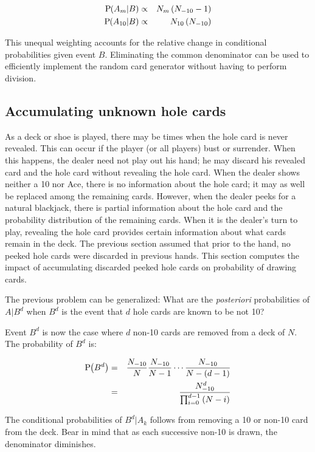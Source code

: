\begin{eqnarray}
\textrm{P}\hspace{-.5ex}\left(A_m|B\right) &\propto& N_m \left(N_{-10}-1\right) \\
\textrm{P}\hspace{-.5ex}\left(A_{10}|B\right) &\propto& N_{10} \left(N_{-10}\right)
\end{eqnarray}

This unequal weighting accounts for the relative change in 
conditional probabilities given event $B$.
Eliminating the common denominator can be used to efficiently implement the
random card generator without having to perform division.

\subsection{Accumulating unknown hole cards}
\label{sec:basic:peeking:accumulate}

As a deck or shoe is played, there may be times when the hole card
is never revealed.  This can occur if the player (or all players)
bust or surrender. 
When this happens, the dealer need not play out his hand; 
he may discard his revealed card and the hole card without revealing
the hole card.
When the dealer shows neither a 10 nor Ace, 
there is no information about the hole card;
it may as well be replaced among the remaining cards.  
However, when the dealer peeks for a natural blackjack,
there is partial information about the hole card
and the probability distribution of the remaining cards.  
When it is the dealer's turn to play, 
revealing the hole card provides certain information about 
what cards remain in the deck.  
The previous section assumed that prior to the hand, 
no peeked hole cards were discarded in previous hands.
This section computes the impact of accumulating discarded peeked hole cards
on probability of drawing cards.  

The previous problem can be generalized:
What are the \emph{posteriori} probabilities of $A|B^d$
when $B^d$ is the event that $d$ hole cards are known to be not 10?

Event $B^d$ is now the case where $d$ non-10 cards are
removed from a deck of $N$.
The probability of $B^d$ is:

\begin{eqnarray}
\textrm{P}\hspace{-.5ex}\left(B^d\right) &=& \frac{N_{-10}}{N}\frac{N_{-10}}{N-1}\cdots\frac{N_{-10}}{N-\left(d-1\right)} \nonumber \\
&=& \frac{N_{-10}^d}{\prod_{i=0}^{d-1}{\left(N-i\right)}}
\end{eqnarray}

\noindent
The conditional probabilities of $B^d|A_k$ follows from 
removing a 10 or non-10 card from the deck.
Bear in mind that as each successive non-10 is drawn, 
the denominator diminishes.

